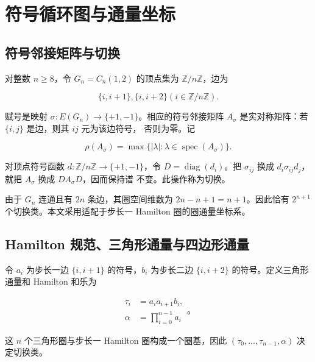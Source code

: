 \section{符号循环图与通量坐标}\label{sec:preliminaries}

\subsection{符号邻接矩阵与切换}

对整数 \(n\geq 8\)，令 \(G_n=C_n(1,2)\) 的顶点集为
\(\mathbb{Z}/n\mathbb{Z}\)，边为

\begin{equation}
\{i,i+1\}, \{i,i+2\}    (i \in \mathbb{Z}/n\mathbb{Z}).
\end{equation}

赋号是映射 \(\sigma:E(G_n)\to \{+1,-1\}\)。相应的符号邻接矩阵
\(A_\sigma\) 是实对称矩阵：若 \(\{i,j\}\) 是边，则其 \(ij\) 元为该边符号，
否则为零。记

\begin{equation}
\rho(A_\sigma)=\max\{\lvert \lambda\rvert: \lambda \in \operatorname{spec}(A_\sigma)\}.
\end{equation}

对顶点符号函数 \(d:\mathbb{Z}/n\mathbb{Z}\to \{+1,-1\}\)，令
\(D=\operatorname{diag}(d_i)\)。把 \(\sigma_{ij}\) 换成
\(d_i\sigma_{ij}d_j\)，就把 \(A_\sigma\) 换成 \(DA_\sigma D\)，因而保持谱
不变。此操作称为切换。

由于 \(G_n\) 连通且有 \(2n\) 条边，其圈空间维数为
\(2n-n+1=n+1\)。因此恰有 \(2^{n+1}\) 个切换类。本文采用适配于步长一
Hamilton 圈的圈通量坐标系。

\subsection{Hamilton 规范、三角形通量与四边形通量}

令 \(a_i\) 为步长一边 \(\{i,i+1\}\) 的符号，\(b_i\) 为步长二边
\(\{i,i+2\}\) 的符号。定义三角形通量和 Hamilton 和乐为

\begin{equation}
\begin{aligned}
\tau_i&=a_i a_{i+1} b_i, \\
\alpha&=\prod_{i=0}^{n-1} a_i
\end{aligned}
\text{。}
\end{equation}

这 \(n\) 个三角形圈与步长一 Hamilton 圈构成一个圈基，因此
\((\tau_{0},\ldots,\tau_{n-1},\alpha)\) 决定切换类。

